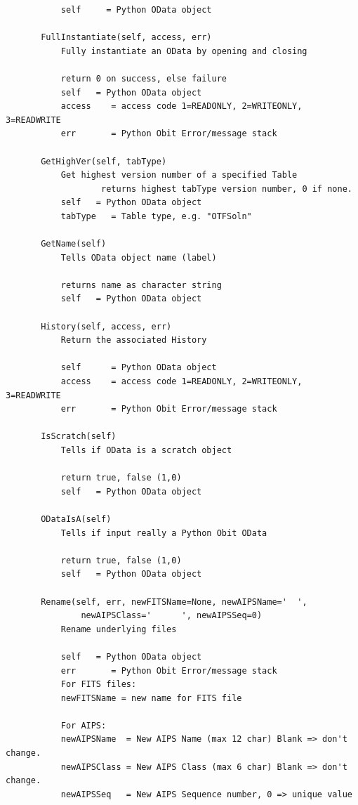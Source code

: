 \documentclass[11pt]{report}
\begin{document}
\begin{verbatim}
           self     = Python OData object
       
       FullInstantiate(self, access, err)
           Fully instantiate an OData by opening and closing
           
           return 0 on success, else failure
           self   = Python OData object
           access    = access code 1=READONLY, 2=WRITEONLY, 3=READWRITE
           err       = Python Obit Error/message stack
       
       GetHighVer(self, tabType)
           Get highest version number of a specified Table
                   returns highest tabType version number, 0 if none.
           self   = Python OData object
           tabType   = Table type, e.g. "OTFSoln"
       
       GetName(self)
           Tells OData object name (label)
           
           returns name as character string
           self   = Python OData object
       
       History(self, access, err)
           Return the associated History
           
           self      = Python OData object
           access    = access code 1=READONLY, 2=WRITEONLY, 3=READWRITE
           err       = Python Obit Error/message stack
       
       IsScratch(self)
           Tells if OData is a scratch object
           
           return true, false (1,0)
           self   = Python OData object
       
       ODataIsA(self)
           Tells if input really a Python Obit OData
           
           return true, false (1,0)
           self   = Python OData object
       
       Rename(self, err, newFITSName=None, newAIPSName='  ',
               newAIPSClass='      ', newAIPSSeq=0)
           Rename underlying files
           
           self   = Python OData object
           err       = Python Obit Error/message stack
           For FITS files:
           newFITSName = new name for FITS file
           
           For AIPS:
           newAIPSName  = New AIPS Name (max 12 char) Blank => don't change.
           newAIPSClass = New AIPS Class (max 6 char) Blank => don't change.
           newAIPSSeq   = New AIPS Sequence number, 0 => unique value
       

\end{verbatim}
\end{document}
